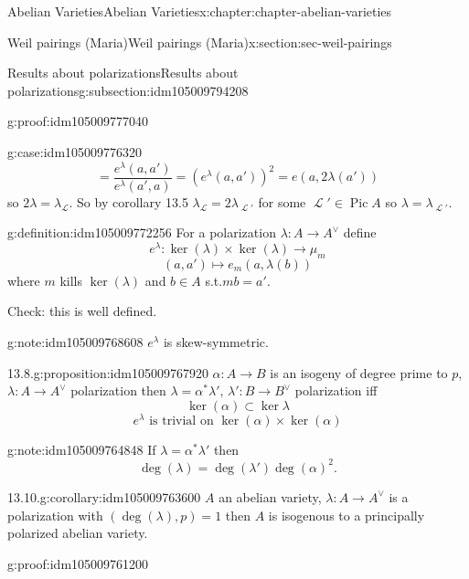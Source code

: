 \documentclass[oneside,10pt,]{book}
\numberwithin{equation}{section}
\newcommand{\sheaf}[1]{\operatorname{\mathcal{#1}}}
\DeclareMathOperator{\Pic}{Pic}
\begin{document}
\begin{chapterptx}{Abelian Varieties}{}{Abelian Varieties}{}{}{x:chapter:chapter-abelian-varieties}
\begin{sectionptx}{Weil pairings (Maria)}{}{Weil pairings (Maria)}{}{}{x:section:sec-weil-pairings}
\begin{subsectionptx}{Results about polarizations}{}{Results about polarizations}{}{}{g:subsection:idm105009794208}
\begin{proofptx}{}{g:proof:idm105009777040}
\begin{case}{}{}{g:case:idm105009776320}
\begin{equation*}
= \frac{e^\lambda(a,a')}{ e^\lambda(a',a)} = (e^\lambda(a,a'))^2 = e(a,2\lambda (a'))
\end{equation*}
so \(2\lambda = \lambda_{\sheaf L}\). So by corollary 13.5 \(\lambda_{\sheaf L} = 2\lambda_{\sheaf L'}\) for some \(\sheaf L' \in \Pic A\) so \(\lambda = \lambda_{\sheaf L'}\).%
\end{case}
\end{proofptx}
\begin{definition}{}{g:definition:idm105009772256}%
For a  polarization \(\lambda \colon A\to A^\vee\) define%
\begin{equation*}
e^{\lambda} \colon \ker(\lambda)\times \ker(\lambda) \to \mu_m
\end{equation*}
%
\begin{equation*}
(a,a')\mapsto e_m(a,\lambda(b))
\end{equation*}
where \(m \) kills \(\ker(\lambda)\) and \(b \in A\) s.t.\(mb = a'\).%
\end{definition}
Check: this is well defined.%
\begin{note}{}{g:note:idm105009768608}%
\(e^\lambda\) is skew-symmetric.%
\end{note}
\begin{proposition}{13.8.}{}{g:proposition:idm105009767920}%
\(\alpha\colon A \to B\) is an isogeny of degree prime to \(p\), \(\lambda\colon A\to A^\vee\) polarization then \(\lambda = \alpha^* \lambda', \,\lambda' \colon B\to B^\vee\) polarization iff%
\begin{equation*}
\ker(\alpha) \subset \ker \lambda
\end{equation*}
%
\begin{equation*}
e^{\lambda} \text{ is trivial on } \ker (\alpha)\times \ker(\alpha)
\end{equation*}
%
\end{proposition}
\begin{note}{}{g:note:idm105009764848}%
If \(\lambda = \alpha^* \lambda'\) then%
\begin{equation*}
\deg(\lambda) = \deg (\lambda') \deg(\alpha)^2\text{.}
\end{equation*}
%
\end{note}
\begin{corollary}{13.10.}{}{g:corollary:idm105009763600}%
\(A\) an abelian variety, \(\lambda \colon A \to A^\vee\) is a polarization with \((\deg (\lambda), p) = 1\) then \(A\) is  isogenous to a principally polarized abelian variety.%
\end{corollary}
\begin{proofptx}{}{g:proof:idm105009761200}

\end{proofptx}
\end{subsectionptx}
\end{sectionptx}
\end{chapterptx}
\end{document}
